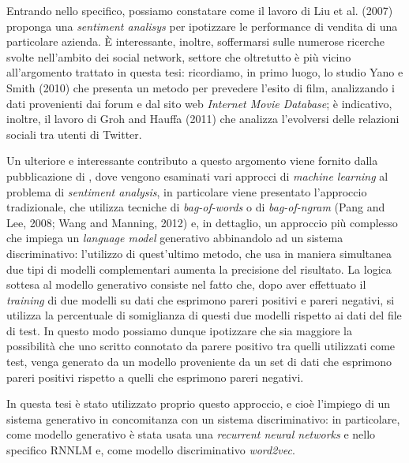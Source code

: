 \documentclass[a4paper,12pt,openright,twoside]{report}
\theoremstyle{definition}
\begin{document}
Entrando nello specifico, possiamo constatare come il lavoro di Liu et al. (2007) %
proponga una \emph{sentiment analisys} per ipotizzare le performance di vendita di una particolare
azienda. 
\`E interessante, inoltre, soffermarsi sulle numerose ricerche svolte nell’ambito dei social network, 
settore che oltretutto è più vicino all’argomento trattato in questa tesi: ricordiamo, in primo luogo,  lo studio 
Yano e Smith (2010) %
che presenta un metodo per prevedere l'esito di film, analizzando i dati
provenienti dai forum e dal sito web \emph{Internet Movie Database}; è indicativo, inoltre,
il lavoro di
Groh and Hauffa (2011) %
che analizza l’evolversi delle relazioni sociali tra utenti di Twitter.

Un ulteriore e interessante contributo a questo argomento viene fornito 
dalla pubblicazione di \cite{Ens2015}, dove vengono esaminati vari
approcci di \emph{machine learning} al problema di \emph{sentiment analysis},
in particolare viene presentato l'approccio tradizionale, che utilizza tecniche di
\emph{bag-of-words} o di \emph{bag-of-ngram} (Pang and Lee, 2008; Wang and Manning, 2012)
e, in dettaglio, un approccio più complesso che impiega un \emph{language model} generativo
abbinandolo ad un sistema discriminativo: 
l’utilizzo di quest’ultimo metodo, che usa in maniera simultanea due tipi di modelli complementari
aumenta la precisione del risultato.
La logica sottesa al modello generativo consiste nel fatto che, dopo aver effettuato il \emph{training}
di due modelli su dati che esprimono pareri positivi e pareri negativi,
si utilizza la percentuale di somiglianza di questi due modelli rispetto ai dati del file di
test. In questo modo 
possiamo dunque ipotizzare che sia maggiore la possibilità che uno scritto connotato 
da parere positivo tra quelli utilizzati come test, venga generato da un modello proveniente 
da un set di dati che esprimono pareri positivi rispetto a quelli che esprimono pareri negativi.

In questa tesi è stato utilizzato proprio questo approccio, 
e cioè l’impiego di un sistema generativo in concomitanza con un sistema discriminativo:
in particolare, come modello generativo  è stata usata una \emph{recurrent neural networks} 
\- e nello specifico RNNLM \- e, come modello discriminativo \emph{word2vec}.
\end{document}
